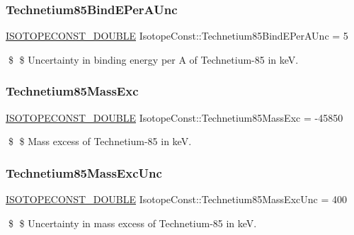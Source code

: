 \subsubsection{\texorpdfstring{Technetium85\+Bind\+E\+Per\+A\+Unc}{Technetium85BindEPerAUnc}}
{\footnotesize\ttfamily \mbox{\hyperlink{group___isotope_const-_macros_ga8f45a7272ce02c0b4c65c44636ed719a}{I\+S\+O\+T\+O\+P\+E\+C\+O\+N\+S\+T\+\_\+\+D\+O\+U\+B\+LE}} Isotope\+Const\+::\+Technetium85\+Bind\+E\+Per\+A\+Unc = 5}

\$ \$ Uncertainty in binding energy per A of Technetium-\/85 in keV. \mbox{\label{group___isotope_const-_technetium-_tc85_ga9e9aaa31b6b2eb4430b5d2d8f36ed8d9}} 
\subsubsection{\texorpdfstring{Technetium85\+Mass\+Exc}{Technetium85MassExc}}
{\footnotesize\ttfamily \mbox{\hyperlink{group___isotope_const-_macros_ga8f45a7272ce02c0b4c65c44636ed719a}{I\+S\+O\+T\+O\+P\+E\+C\+O\+N\+S\+T\+\_\+\+D\+O\+U\+B\+LE}} Isotope\+Const\+::\+Technetium85\+Mass\+Exc = -\/45850}

\$ \$ Mass excess of Technetium-\/85 in keV. \mbox{\label{group___isotope_const-_technetium-_tc85_gae1eb63472b85385c2d8d7cf29ac0cbdb}} 
\subsubsection{\texorpdfstring{Technetium85\+Mass\+Exc\+Unc}{Technetium85MassExcUnc}}
{\footnotesize\ttfamily \mbox{\hyperlink{group___isotope_const-_macros_ga8f45a7272ce02c0b4c65c44636ed719a}{I\+S\+O\+T\+O\+P\+E\+C\+O\+N\+S\+T\+\_\+\+D\+O\+U\+B\+LE}} Isotope\+Const\+::\+Technetium85\+Mass\+Exc\+Unc = 400}

\$ \$ Uncertainty in mass excess of Technetium-\/85 in keV. \mbox{\label{group___isotope_const-_technetium-_tc85_ga9706cb15138efb9c328612b9f811cd1b}} 
